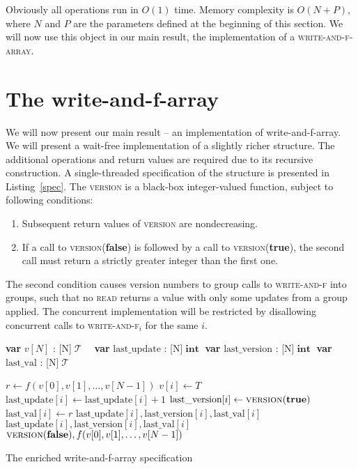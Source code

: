 \documentclass[a4paper,11pt]{article}
\def\T{\ensuremath{\operatorname{\mathcal{T}}}\text{ }}
\def\int{\ensuremath{\operatorname{\textbf{int}}}}
\newcommand{\fn}[1]{\textsc{#1}}
\newcommand{\var}[2]{\textbf{var }#1 : #2}
\newcommand{\arrayspec}[1]{\text{array}[#1]\text{ of }}
\begin{document}
Obviously all operations run in $O(1)$ time. Memory complexity is $O(N+P)$, where $N$ and $P$ are the parameters defined at the beginning of this section.
We will now use this object in our main result, the implementation of a \textsc{write-and-f-array}.
\section{The write-and-f-array}

We will now present our main result -- an implementation of write-and-f-array.
We will present a wait-free implementation of a slightly richer structure. The additional operations and return values are required due to its recursive construction.
A single-threaded specification of the structure is presented in Listing~\ref{spec}. The \fn{version} is a black-box integer-valued function, subject to following conditions:
\begin{enumerate}
	\item Subsequent return values of \fn{version} are nondecreasing.
	\item If a call to \fn{version}(\textbf{false}) is followed by a call to \fn{version}(\textbf{true}), the second call must return a strictly greater integer than the first one.
\end{enumerate}
The second condition causes version numbers to group calls to \fn{write-and-f} into groups, such that no \fn{read} returns a value with only some updates from a group applied.
The concurrent implementation will be restricted by disallowing concurrent calls to \fn{write-and-f$_i$} for the same $i$.

\begin{Listing}
\begin{algorithmic}[1]
	\State\var{$v[N]$}{\arrayspec{N}$\T$}
	\State\var{$\text{last\_update}$}{\arrayspec{N}\int}
	\State\var{$\text{last\_version}$}{\arrayspec{N}\int}
	\State\var{$\text{last\_val}$}{\arrayspec{N}\T}
	
		\State $r \gets f(v[0], v[1],\ldots, v[N-1])$
		\State $v[i] \gets T$
		\State $\text{last\_update}[i] \gets \text{last\_update}[i] + 1$
		\State $\text{last\_version}[i] \gets \fn{version}(\textbf{true})$
		\State $\text{last\_val}[i] \gets r$
		\State \Return $\text{last\_update}[i], \text{last\_version}[i], \text{last\_val}[i]$
	\EndFunction
		\State \Return $\text{last\_update}[i], \text{last\_version}[i], \text{last\_val}[i]$
	\EndFunction
		\State \Return $\fn{version}(\textbf{false}), f(v[0], v[1],\ldots, v[N-1])$
	\EndFunction
\end{algorithmic}
\caption{The enriched write-and-f-array specification}
\label{spec}
\end{Listing}
\end{document}
